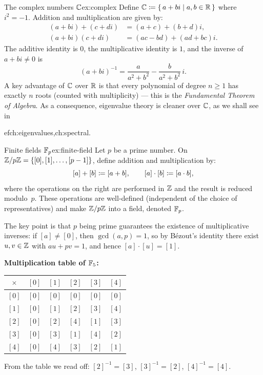 \begin{example}{The complex numbers ${\mathbb{C}}$}{ex:complex}
Define ${\mathbb{C}} \coloneqq \left\{\,a+bi\;\middle|\;a,b\in{\mathbb{R}}\,\right\}$ where $i^2=-1$. Addition and
multiplication are given by:
\begin{align*}
  (a+bi)+(c+di) &= (a+c)+(b+d)i, \\
  (a+bi)(c+di)  &= (ac-bd)+(ad+bc)i.
\end{align*}
The additive identity is $0$, the multiplicative identity is $1$, and the
inverse of $a+bi\neq 0$ is
\[
  (a+bi)^{-1} = \frac{a}{a^2+b^2} - \frac{b}{a^2+b^2}\,i.
\]
A key advantage of ${\mathbb{C}}$ over ${\mathbb{R}}$ is that every polynomial of degree
$n\geq 1$ has exactly $n$ roots (counted with multiplicity) --- this is
the \emph{Fundamental Theorem of Algebra}. As a consequence, eigenvalue
theory is cleaner over ${\mathbb{C}}$, as we shall see in

ef{ch:eigenvalues,ch:spectral}.
\end{example}

\begin{example}{Finite fields ${\mathbb{F}}_p$}{ex:finite-field}
Let $p$ be a prime number. On ${\mathbb{Z}}/p{\mathbb{Z}} = \left\{[0],[1],\ldots,[p-1]\right\}$,
define addition and multiplication by:
\[
  [a]+[b]\coloneqq[a+b],\qquad [a]\cdot[b]\coloneqq[a\cdot b],
\]
where the operations on the right are performed in ${\mathbb{Z}}$ and the result is
reduced modulo~$p$. These operations are well-defined (independent of the
choice of representatives) and make ${\mathbb{Z}}/p{\mathbb{Z}}$ into a field, denoted
${\mathbb{F}}_p$.

The key point is that $p$ being prime guarantees the existence of
multiplicative inverses: if $[a]\neq[0]$, then $\gcd(a,p)=1$, so by
B\'{e}zout's identity there exist $u,v\in{\mathbb{Z}}$ with $au+pv=1$, and hence
$[a]\cdot[u]=[1]$.

\medskip\noindent
\textbf{Multiplication table of ${\mathbb{F}}_5$:}

\smallskip
\begin{center}
\begin{tabular}{c|ccccc}
$\times$ & $[0]$ & $[1]$ & $[2]$ & $[3]$ & $[4]$ \\
\midrule
$[0]$ & $[0]$ & $[0]$ & $[0]$ & $[0]$ & $[0]$ \\
$[1]$ & $[0]$ & $[1]$ & $[2]$ & $[3]$ & $[4]$ \\
$[2]$ & $[0]$ & $[2]$ & $[4]$ & $[1]$ & $[3]$ \\
$[3]$ & $[0]$ & $[3]$ & $[1]$ & $[4]$ & $[2]$ \\
$[4]$ & $[0]$ & $[4]$ & $[3]$ & $[2]$ & $[1]$ \\
\end{tabular}
\end{center}

\smallskip
From the table we read off: $[2]^{-1}=[3]$, $[3]^{-1}=[2]$,
$[4]^{-1}=[4]$.
\end{example}

